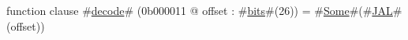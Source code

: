 function clause #\hyperref[zdecode]{decode}# (0b000011 @ offset : #\hyperref[zbits]{bits}#(26)) =
  #\hyperref[zSome]{Some}#(#\hyperref[zJAL]{JAL}#(offset))
